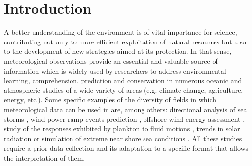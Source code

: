 \documentclass[energies,article,submit,moreauthors,pdftex]{Definitions/mdpi}
\begin{document}

	\section{Introduction}
		
		A better understanding of the environment is of vital importance for science, contributing not only to more efficient exploitation of natural resources but also to the development of new strategies aimed at its protection. In that sense, meteorological observations provide an essential and valuable source of information which is widely used by researchers to address environmental learning, comprehension, prediction and conservation in numerous oceanic and atmospheric studies of a wide variety of areas (e.g. climate change, agriculture, energy, etc.). Some specific examples of the diversity of fields in which meteorological data can be used in are, among others: directional analysis of sea storms \cite{LAFACE201545}, wind power ramp events prediction \cite{DORADOMORENO2017428}, offshore wind energy assessment \cite{DVORAK20101244}, study of the responses exhibited by plankton to fluid motions \cite{FUCHS2016109}, trends in solar radiation \cite{SILVA20101852} or simulation of extreme near shore sea conditions \cite{GOULDBY201415}. All these studies require a prior data collection and its adaptation to a specific format that allows the interpretation of them.
		
\end{document}

